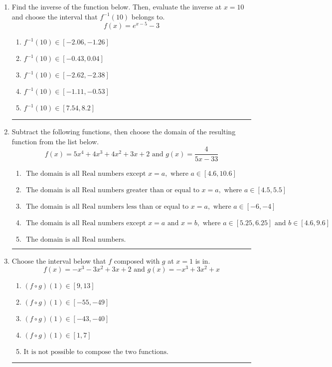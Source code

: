 \documentclass[14pt]{extbook}
\newcommand{\litem}[1]{\item#1\hspace*{-1cm}\rule{\textwidth}{0.4pt}}
\begin{document}
\begin{enumerate}
\litem{
Find the inverse of the function below. Then, evaluate the inverse at $x = 10$ and choose the interval that $f^{-1}(10)$ belongs to.\[ f(x) = e^{x-5}-3 \]\begin{enumerate}[label=\Alph*.]
\item \( f^{-1}(10) \in [-2.06, -1.26] \)
\item \( f^{-1}(10) \in [-0.43, 0.04] \)
\item \( f^{-1}(10) \in [-2.62, -2.38] \)
\item \( f^{-1}(10) \in [-1.11, -0.53] \)
\item \( f^{-1}(10) \in [7.54, 8.2] \)

\end{enumerate} }
\litem{
Subtract the following functions, then choose the domain of the resulting function from the list below.\[ f(x) = 5x^{4} +4 x^{3} +4 x^{2} +3 x + 2 \text{ and } g(x) = \frac{4}{5x-33} \]\begin{enumerate}[label=\Alph*.]
\item \( \text{ The domain is all Real numbers except } x = a, \text{ where } a \in [4.6, 10.6] \)
\item \( \text{ The domain is all Real numbers greater than or equal to } x = a, \text{ where } a \in [4.5, 5.5] \)
\item \( \text{ The domain is all Real numbers less than or equal to } x = a, \text{ where } a \in [-6, -4] \)
\item \( \text{ The domain is all Real numbers except } x = a \text{ and } x = b, \text{ where } a \in [5.25, 6.25] \text{ and } b \in [4.6, 9.6] \)
\item \( \text{ The domain is all Real numbers. } \)

\end{enumerate} }
\litem{
Choose the interval below that $f$ composed with $g$ at $x=1$ is in.\[ f(x) = -x^{3} -3 x^{2} +3 x + 2 \text{ and } g(x) = -x^{3} +3 x^{2} +x \]\begin{enumerate}[label=\Alph*.]
\item \( (f \circ g)(1) \in [9, 13] \)
\item \( (f \circ g)(1) \in [-55, -49] \)
\item \( (f \circ g)(1) \in [-43, -40] \)
\item \( (f \circ g)(1) \in [1, 7] \)
\item \( \text{It is not possible to compose the two functions.} \)


\end{enumerate}}
\end{enumerate}
\end{document}
